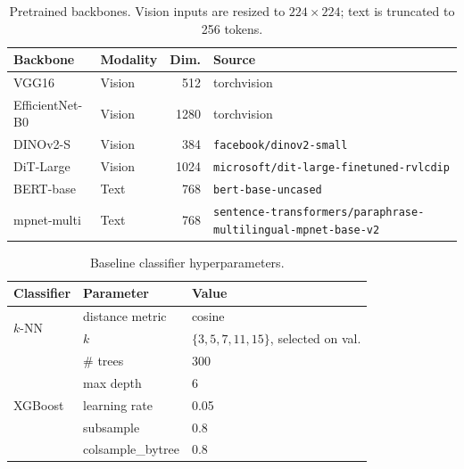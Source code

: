 
\begin{table}[t]
\centering
\caption{Pretrained backbones. Vision inputs are resized to $224\times224$; text is truncated to 256 tokens.}
\label{tab:backbones}
\small
\begin{tabular}{llrl}
\toprule
Backbone & Modality & Dim. & Source \\
\midrule
VGG16            & Vision & 512  & torchvision \\
EfficientNet-B0  & Vision & 1280 & torchvision \\
DINOv2-S         & Vision & 384  & \texttt{facebook/dinov2-small} \\
DiT-Large        & Vision & 1024 & \texttt{microsoft/dit-large-finetuned-rvlcdip} \\
BERT-base        & Text   & 768  & \texttt{bert-base-uncased} \\
mpnet-multi      & Text   & 768  & \texttt{sentence-transformers/}\allowbreak\texttt{paraphrase-multilingual-mpnet-base-v2} \\
\bottomrule
\end{tabular}
\end{table}

\begin{table}[t]
\centering
\caption{Baseline classifier hyperparameters.}
\label{tab:baseline-hparams}
\small
\begin{tabular}{lll}
\toprule
Classifier & Parameter & Value \\
\midrule
\multirow{2}{*}{$k$-NN}
 & distance metric & cosine \\
 & $k$ & $\{3,5,7,11,15\}$, selected on val. \\
\midrule
\multirow{5}{*}{XGBoost}
 & \# trees & 300 \\
 & max depth & 6 \\
 & learning rate & 0.05 \\
 & subsample & 0.8 \\
 & colsample\_bytree & 0.8 \\
\bottomrule
\end{tabular}
\end{table}

